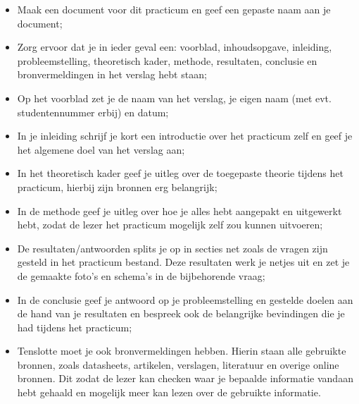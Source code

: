 \documentclass[12pt]{article}
\begin{document}
\begin{itemize}
    \item Maak een document voor dit practicum en geef een gepaste naam aan je document;
    \item Zorg ervoor dat je in ieder geval een: voorblad, inhoudsopgave, inleiding, probleemstelling, theoretisch kader, methode, resultaten, conclusie en bronvermeldingen in het verslag hebt staan;
    \item Op het voorblad zet je de naam van het verslag, je eigen naam (met evt. studentennummer erbij) en datum;
    \item In je inleiding schrijf je kort een introductie over het practicum zelf en geef je het algemene doel van het verslag aan;
    \item In het theoretisch kader geef je uitleg over de toegepaste theorie tijdens het practicum, hierbij zijn bronnen erg belangrijk;
    \item In de methode geef je uitleg over hoe je alles hebt aangepakt en uitgewerkt hebt, zodat de lezer het practicum mogelijk zelf zou kunnen uitvoeren;
    \item De resultaten/antwoorden splits je op in secties net zoals de vragen zijn gesteld in het practicum bestand. Deze resultaten werk je netjes uit en zet je de gemaakte foto's en schema's in de bijbehorende vraag;
    \item In de conclusie geef je antwoord op je probleemstelling en gestelde doelen aan de hand van je resultaten en bespreek ook de belangrijke bevindingen die je had tijdens het practicum;
    \item Tenslotte moet je ook bronvermeldingen hebben. Hierin staan alle gebruikte bronnen, zoals datasheets, artikelen, verslagen, literatuur en overige online bronnen. Dit zodat de lezer kan checken waar je bepaalde informatie vandaan hebt gehaald en mogelijk meer kan lezen over de gebruikte informatie.
\end{itemize}
\pagebreak
\end{document}

